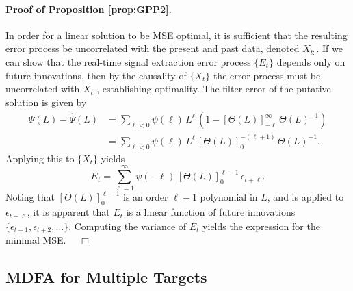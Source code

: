 \documentclass[a4paper]{book}
\begin{document}
\paragraph{Proof of Proposition \ref{prop:GPP2}.}
 In order for a linear solution to be MSE optimal, it is sufficient that the
 resulting error process be uncorrelated with the present and past data, denoted $X_{t:}$.
   If we can show that the real-time signal extraction error process $\{ E_t \}$
  depends only on future innovations, then by the causality of $\{ X_t \}$ the error process 
  must be uncorrelated   with $X_{t:}$, establishing optimality.  
 The filter error of the putative solution is  
  given by
\begin{align*}
 \Psi (L) - \widehat{\Psi} (L) & = \sum_{\ell < 0 } \psi (\ell) \, L^{\ell} \,
   \left( 1 -   {[ \Theta (L) ]}_{-\ell}^{\infty} \, { \Theta (L) }^{-1} \right) \\
  & =  \sum_{\ell < 0 } \psi (\ell) \, L^{\ell} \, 
  {[ \Theta (L) ]}_{0}^{ -(\ell + 1)} \, { \Theta (L) }^{-1}.
\end{align*}
 Applying this to $\{ X_t \}$ yields
\[
  E_t = \sum_{\ell =1 }^{\infty} \psi (-\ell) \, {[ \Theta (L) ]}_0^{\ell - 1} \, 
   \epsilon_{t + \ell }.
\]
  Noting that ${[ \Theta (L) ]}_0^{\ell - 1}$ is an order $\ell-1$ polynomial in $L$,
 and is applied to $\epsilon_{t+ \ell}$, it is apparent that $E_t$ is a linear function
 of future innovations $\{ \epsilon_{t+1}, \epsilon_{t+2}, \ldots \}$.  Computing
 the variance of $E_t$ yields the expression for the minimal MSE.  $\quad \Box$

 
\subsection{MDFA for Multiple Targets}
\end{document}
